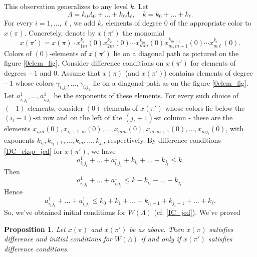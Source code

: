 \documentclass[a4paper, 10pt,oneside]{amsart}
\newtheorem{prop}[tm]{Proposition}
\begin{document}
This observation generalizes to any level $k$. Let
$$\Lambda=k_0 \Lambda_0+\dots+k_\ell \Lambda_\ell,\quad k=k_0+\dots+k_\ell.$$
For every
$i=1,\dots,\ell$, we add $k_i$ elements of degree $0$ of the appropriate color to $x(\pi)$. Concretely, denote by $x(\pi')$ the monomial
$$x(\pi')=x(\pi)\cdot x_{1m}^{k_1}(0)x_{2m}^{k_2}(0)\cdots
x_{mm}^{k_m}(0)x_{m,m+1}^{k_{m+1}}(0)\cdots x_{m \ell}^{k_\ell}(0)
.$$ Colors of  $(0)$-elements of $x(\pi')$ lie on a diagonal
path as pictured on the figure \ref{0elem_fig}.
Consider difference conditions on $x(\pi')$ for
elements of degrees $-1$ and $0$. Assume that $x(\pi)$ (and $x(\pi')$)  contains elements
of degree $-1$ whose colors $\gamma_{i_1 j_t},\dots,\gamma_{i_t j_1} $ lie on a diagonal path as on the figure \ref{0elem_fig}.
Let $a_{i_1
j_t}^1,\dots,a_{i_t j_1}^1$ be the exponents of these elements. For every such choice
of $(-1)$-elements,
consider $(0)$-elements of $x(\pi')$ whose colors lie below the
$(i_t-1)$-st row and on the left of the $(j_t+1)$-st column - these are the elements
$x_{i_t m}(0),x_{i_t+1,
m}(0),\dots,x_{mm}(0),x_{m,m+1}(0),\dots,x_{mj_t}(0)$, with exponents
$k_{i_t},k_{i_t+1},\dots,k_m,\dots,k_{j_t}$, respectively. By difference conditions \eqref{DC_eksp_jed}
for $x(\pi')$, we have
$$a_{i_1 j_t}^1+\dots+a_{i_t j_1}^1+k_{i_t}+\dots+k_{j_t} \leq k.$$
Then
$$a_{i_1 j_t}^1+\dots+a_{i_t j_1}^1\leq k-k_{i_t}-\dots-k_{j_t}.$$
Hence
$$a_{i_1 j_t}^1+\dots+a_{i_t j_1}^1\leq k_0+k_1+\dots+k_{i_t-1}+k_{j_t+1}+\dots+k_\ell.$$
So, we've obtained initial conditions for $W(\Lambda)$ (cf.
\eqref{IC_jed}). We've proved
\begin{prop}
Let $x(\pi)$ and $x(\pi')$ be as above.
Then $x(\pi)$ satisfies difference and initial conditions
for $W(\Lambda)$ if and only if
$x(\pi')$ satisfies difference conditions.
\end{prop}
\end{document}
